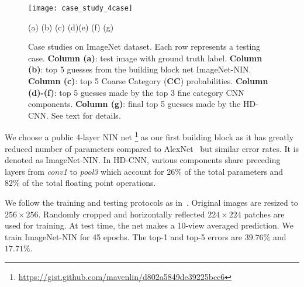\documentclass[10pt,twocolumn,letterpaper]{article}
\begin{document}
\begin{figure*}[ht]
\begin{center}
\texttt{[image: case\_study\_4case]}
 \centerline{(a) \hfill (b) \hfill (c) \hfill (d)\hfill (e) \hfill (f) \hfill (g)}
\end{center}
\vspace{-1em}
   \caption{Case studies on ImageNet dataset. Each row represents a testing case. \textbf{Column (a)}: test image with ground truth label. \textbf{Column (b)}: top 5 guesses from the building block net ImageNet-NIN.  \textbf{Column (c)}: top 5 Coarse Category (\textbf{CC}) probabilities. \textbf{Column (d)-(f)}: top 5 guesses made by the top 3 fine category CNN components. \textbf{Column (g)}: final top 5 guesses made by the HD-CNN.  See text for details.
}
\vspace{-2.5em}
\label{fig:case study}
\end{figure*}

We choose a public 4-layer NIN net \footnote{\url{https://gist.github.com/mavenlin/d802a5849de39225bcc6}} as our first building block as it has greatly reduced number of parameters compared to AlexNet~\cite{krizhevsky2012imagenet} but similar error rates. It is denoted as ImageNet-NIN. In HD-CNN, various components share preceding layers from \textit{conv1} to \textit{pool3} which account for $26\%$ of the total parameters and $82\%$ of the total floating point operations.


We follow the training and testing protocols as in~\cite{krizhevsky2012imagenet}. Original images are resized to $256\times 256$. Randomly cropped and horizontally reflected $224\times 224$ patches are used for training. At test time, the net makes a 10-view averaged prediction.  We train ImageNet-NIN for 45 epochs. The top-1 and top-5 errors are $39.76\%$ and $17.71\%$.
\end{document}
